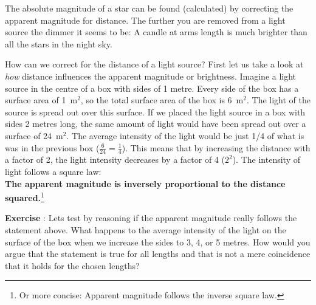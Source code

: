 The absolute magnitude of a star can be found (calculated) by correcting the apparent magnitude for distance. The further you are removed from a light source the dimmer it seems to be: A candle at arms length is much brighter than all the stars in the night sky.

How can we correct for the distance of a light source? First let us take a look at \emph{how} distance influences the apparent magnitude or brightness. Imagine a light source in the centre of a box with sides of 1 metre. Every side of the box has a surface area of 1~m$^2$, so the total surface area of the box is 6~m$^2$. The light of the source is spread out over this surface. If we placed the light source in a box with sides 2 metres long, the same amount of light would have been spread out over a surface of 24~m$^2$. The average intensity of the light would be just 1/4 of what is was in the previous box ($\frac{6}{24}=\frac{1}{4}$). This means that by increasing the distance with a factor of 2, the light intensity decreases by a factor of 4 ($2^2$). The intensity of light follows a square law: \\
\indent \textbf{The apparent magnitude is inversely proportional to the distance squared.}\footnote{Or more concise: Apparent magnitude follows the inverse square law.}

\begin{shaded}
\textbf{Exercise \theExercise {}} : Lets test by reasoning if the apparent magnitude really follows the statement above. What happens to the average intensity of the light on the surface of the box when we increase the sides to 3, 4, or 5 metres. How would you argue that the statement is true for all lengths and that is not a mere coincidence that it holds for the chosen lengths?\end{shaded}


